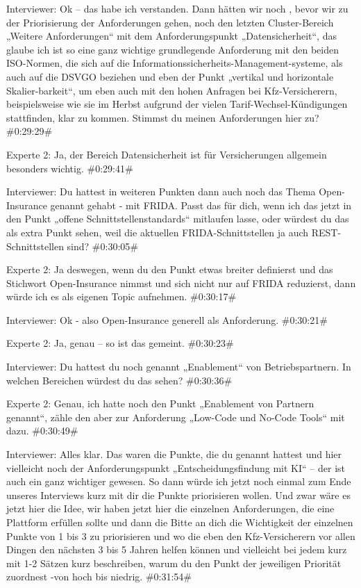Interviewer:
Ok – das habe ich verstanden. Dann hätten wir noch , bevor wir zu der Priorisierung der Anforderungen gehen, noch den letzten Cluster-Bereich „Weitere Anforderungen“ mit dem Anforderungspunkt „Datensicherheit“, das glaube ich ist so eine ganz wichtige grundlegende Anforderung mit den beiden ISO-Normen, die sich auf die Informationssicherheits-Management-systeme, als auch auf die DSVGO beziehen und eben der Punkt „vertikal und horizontale Skalier-barkeit“, um eben auch mit den hohen Anfragen bei Kfz-Versicherern, beispielsweise wie sie im Herbst aufgrund der vielen Tarif-Wechsel-Kündigungen stattfinden, klar zu kommen. Stimmst du meinen Anforderungen hier zu?
\#0:29:29\#

Experte 2:
Ja, der Bereich Datensicherheit ist für Versicherungen allgemein besonders wichtig.
\#0:29:41\#

Interviewer:
Du hattest in weiteren Punkten dann auch noch das Thema Open-Insurance genannt gehabt - mit FRIDA. Passt das für dich, wenn ich das jetzt in den Punkt „offene Schnittstellenstandards“ mitlaufen lasse, oder würdest du das als extra Punkt sehen, weil die aktuellen FRIDA-Schnittstellen ja auch REST-Schnittstellen sind? 
\#0:30:05\#

Experte 2:
Ja deswegen, wenn du den Punkt etwas breiter definierst und das Stichwort Open-Insurance nimmst und sich nicht nur auf FRIDA reduzierst, dann würde ich es als eigenen Topic aufnehmen.
\#0:30:17\#

Interviewer:
Ok - also Open-Insurance generell als Anforderung.
\#0:30:21\#

Experte 2:
Ja, genau – so ist das gemeint.
\#0:30:23\#

Interviewer:
Du hattest du noch genannt „Enablement“ von Betriebspartnern. In welchen Bereichen würdest du das sehen?
\#0:30:36\#

Experte 2:
Genau, ich hatte noch den Punkt „Enablement von Partnern genannt“, zähle den aber zur Anforderung „Low-Code und No-Code Tools“ mit dazu.
\#0:30:49\#

Interviewer:
Alles klar. Das waren die Punkte, die du genannt hattest und hier vielleicht noch der Anforderungspunkt „Entscheidungsfindung mit KI“ – der ist auch ein ganz wichtiger gewesen. So dann würde ich jetzt noch einmal zum Ende unseres Interviews kurz mit dir die Punkte priorisieren wollen. Und zwar wäre es jetzt hier die Idee, wir haben jetzt hier die einzelnen Anforderungen, die eine Plattform erfüllen sollte und dann die Bitte an dich die Wichtigkeit der einzelnen Punkte von 1 bis 3 zu priorisieren und wo die eben den Kfz-Versicherern vor allen Dingen den nächsten 3 bis 5 Jahren helfen können und vielleicht bei jedem kurz mit 1-2 Sätzen kurz beschreiben, warum du den Punkt der jeweiligen Priorität zuordnest -von hoch bis niedrig.
\#0:31:54\#

